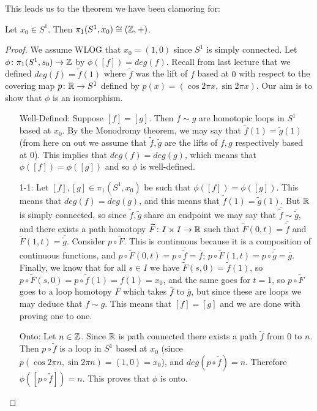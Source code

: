 This leads us to the theorem we have been clamoring for:
\begin{theorem}
	Let $x_0\in S^1$. Then $\pi_1(S^1,x_0)\cong (\mathbb Z,+)$. 
\end{theorem}
\begin{proof}
	We assume WLOG that $x_0=(1,0)$ since $S^1$ is simply connected. Let $\phi \colon \pi_1(S^1,s_0)\to \mathbb Z$ by $\phi([f])=deg(f)$. Recall from last lecture that we defined $deg(f)=\widetilde{f}(1)$ where $\widetilde{f}$ was the lift of $f$ based at $0$ with respect to the covering map $p\colon \mathbb R\to S^1$ defined by $p(x)=(\cos 2\pi x, \sin 2\pi x)$. Our aim is to show that $\phi$ is an isomorphism.
	\begin{itemize}
		\item[Well-Defined:] Suppose $[f]=[g]$. Then $f\sim g$ are homotopic loops in $S^1$ based at $x_0$. By the Monodromy theorem, we may say that $\widetilde{f}(1)=\widetilde{g}(1)$ (from here on out we assume that $\widetilde{f},\widetilde{g}$ are the lifts of $f,g$ respectively based at $0$). This implies that $deg(f)=deg(g)$, which means that $\phi([f])=\phi([g])$ and so $\phi$ is well-defined.
		
		\item[1-1:] Let $[f],[g]\in \pi_1(S^1,x_0)$ be such that $\phi([f])=\phi([g])$. This means that $deg(f)=deg(g)$, and this means that $\widetilde{f}(1)=\widetilde{g}(1)$. But $\mathbb R$ is simply connected, so since $\widetilde{f},\widetilde{g}$ share an endpoint we may say that $\overline{\widetilde{f}}\sim \overline{\widetilde{g}}$, and there exists a path homotopy $\widetilde{F}\colon I\times I\to \mathbb R$ such that $\widetilde{F}(0,t)=\overline{\widetilde{f}}$ and $\widetilde{F}(1,t)=\overline{\widetilde{g}}$. Consider $p\circ \widetilde{F}$. This is continuous because it is a composition of continuous functions, and $p\circ \widetilde{F}(0,t)=p\circ \overline{\widetilde{f}}=\overline{f}$; $p\circ \widetilde{F}(1,t)=p\circ \overline{\widetilde{g}}=\overline{g}$. Finally, we know that for all $s\in I$ we have $\widetilde{F}(s,0)=\widetilde{f}(1)$, so $p\circ \widetilde{F}(s,0)=p\circ \widetilde{f}(1)=f(1)=x_0$, and the same goes for $t=1$, so $p\circ \widetilde{F}$ goes to a loop homotopy $F$ which takes $\overline{f}$ to $\overline{g}$, but since these are loops we may deduce that $f\sim g$. This means that $[f]=[g]$ and we are done with proving one to one.
		
		\item[Onto:] Let $n\in \mathbb Z$. Since $\mathbb R$ is path connected there exists a path $\widetilde{f}$ from $0$ to $n$. Then $p\circ \widetilde{f}$ is a loop in $S^1$ based at $x_0$ (since $p(\cos 2\pi n, \sin 2\pi n)=(1,0)=x_0$), and $deg(p\circ \widetilde{f})=n$. Therefore $\phi([p\circ \widetilde{f}])=n$. This proves that $\phi$ is onto.
		

\end{itemize}
\end{proof}
